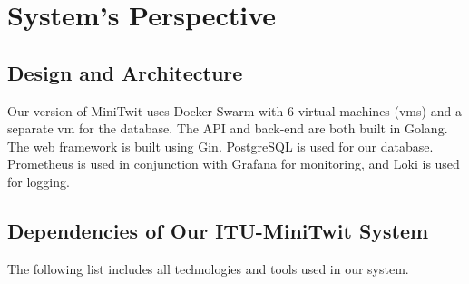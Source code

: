 \section{System's Perspective}

\subsection{Design and Architecture}
Our version of MiniTwit uses Docker Swarm with 6 virtual machines (vms) and a separate vm for the database. The API and back-end are both built in Golang. The web framework is built using Gin. PostgreSQL is used for our database. Prometheus is used in conjunction with Grafana for monitoring, and Loki is used for logging.  

\subsection{Dependencies of Our ITU-MiniTwit System}
The following list includes all technologies and tools used in our system.

